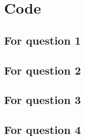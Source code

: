 \documentclass[11pt,letterpaper]{article}
\begin{document}
\pagebreak
\appendix

\section{Code}

\subsection{For question 1}
\label{app:q1-code}



\subsection{For question 2}
\label{app:q2-code}



\subsection{For question 3}
\label{app:q3-code}



\subsection{For question 4}
\label{app:q4-code}


\end{document}
